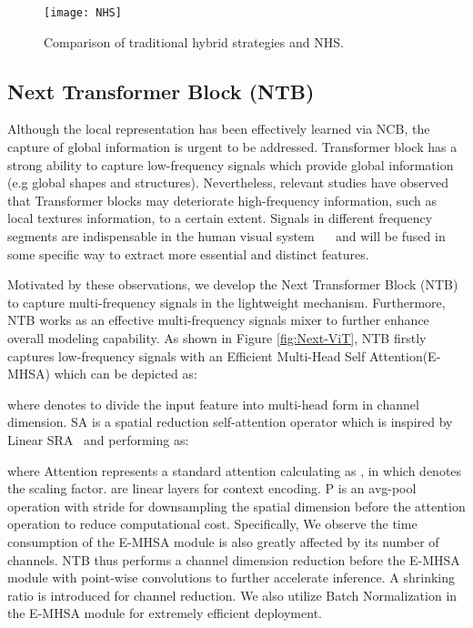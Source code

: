 \documentclass[10pt,twocolumn,letterpaper]{article}
\begin{document}
\begin{figure}[]
    \centering
    \texttt{[image: NHS]}
    \caption{Comparison of traditional hybrid strategies and NHS.}
    \label{fig:NHS}
\end{figure}

\subsection{Next Transformer Block (NTB)}
Although the local representation has been effectively learned via NCB, the capture of global information is urgent to be addressed. Transformer block has a strong ability to capture low-frequency signals which provide global information (e.g global shapes and structures). Nevertheless, relevant studies \cite{park2022vision} have observed that Transformer blocks may deteriorate high-frequency information, such as local textures information, to a certain extent. Signals in different frequency segments are indispensable in the human visual system  ~\cite{bullier2001integrated}~\cite{kauffmann2014neural} and will be fused in some specific way to extract more essential and distinct features. 

Motivated by these observations, we develop the Next Transformer Block (NTB) to capture multi-frequency signals in the lightweight mechanism. Furthermore, NTB works as an effective multi-frequency signals mixer to further enhance overall modeling capability. As shown in Figure \ref{fig:Next-ViT}, NTB firstly captures low-frequency signals with an Efficient Multi-Head Self Attention(E-MHSA) which can be depicted as:

where  denotes to divide the input feature  into multi-head form in channel dimension. SA is a spatial reduction self-attention operator which is inspired by Linear SRA~\cite{PVT_v2} and performing as:

where Attention represents a standard attention calculating as , in which  denotes the scaling factor.  are linear layers for context encoding. P is an avg-pool operation with stride  for downsampling the spatial dimension before the attention operation to reduce computational cost. Specifically, We observe the time consumption of the E-MHSA module is also greatly affected by its number of channels. NTB thus performs a channel dimension reduction before the E-MHSA module with point-wise convolutions to further accelerate inference. A shrinking ratio  is introduced for channel reduction. We also utilize Batch Normalization in the E-MHSA module for extremely efficient deployment. 
\end{document}
